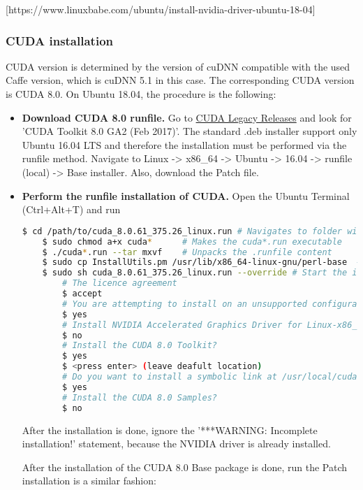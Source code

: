 [https://www.linuxbabe.com/ubuntu/install-nvidia-driver-ubuntu-18-04]

\subsubsection{CUDA installation}

CUDA version is determined by the version of cuDNN compatible with the used Caffe version, which is cuDNN 5.1 in this case. The corresponding CUDA version is CUDA 8.0. On Ubuntu 18.04, the procedure is the following:

\begin{itemize}
	\item \textbf{Download CUDA 8.0 runfile.} Go to \href{https://developer.nvidia.com/cuda-80-ga2-download-archive}{CUDA Legacy Releases} and look for 'CUDA Toolkit 8.0 GA2 (Feb 2017)'. The standard .deb installer support only Ubuntu 16.04 LTS and therefore the installation must be performed via the runfile method. Navigate to Linux -> x86\_64 -> Ubuntu -> 16.04 -> runfile (local) -> Base installer. Also, download the Patch file. 
	
	\item \textbf{Perform the runfile installation of CUDA.} Open the Ubuntu Terminal (Ctrl+Alt+T) and run
	
	\begin{lstlisting}[language=bash]
	$ cd /path/to/cuda_8.0.61_375.26_linux.run # Navigates to folder with CUDA
	$ sudo chmod a+x cuda*		# Makes the cuda*.run executable
	$ ./cuda*.run --tar mxvf 	# Unpacks the .runfile content
	$ sudo cp InstallUtils.pm /usr/lib/x86_64-linux-gnu/perl-base  # Copy one of the extracted files to perl-base
	$ sudo sh cuda_8.0.61_375.26_linux.run --override # Start the installation 
		# The licence agreement
		$ accept 
		# You are attempting to install on an unsupported configuration. Do you wish to continue?
		$ yes 
		# Install NVIDIA Accelerated Graphics Driver for Linux-x86_64 375.26?
		$ no
		# Install the CUDA 8.0 Toolkit?
		$ yes 
		$ <press enter> (leave deafult location)
		# Do you want to install a symbolic link at /usr/local/cuda?
		$ yes
		# Install the CUDA 8.0 Samples?
		$ no
	\end{lstlisting}
	
	After the installation is done, ignore the '***WARNING: Incomplete installation!' statement, because the NVIDIA driver is already installed. 
	
	After the installation of the CUDA 8.0 Base package is done, run the Patch installation is a similar fashion:
	

\end{itemize}
